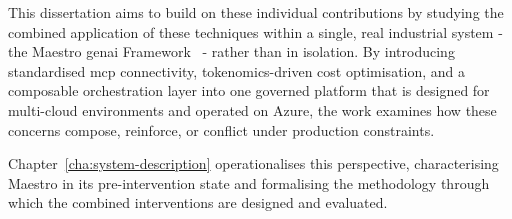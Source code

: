 This dissertation aims to build on these individual contributions by studying the combined application of these techniques within a single, real industrial system - the Maestro \gls{genai} Framework~\cite{closer2025maestro} - rather than in isolation. By introducing standardised \gls{mcp} connectivity, tokenomics-driven cost optimisation, and a composable orchestration layer into one governed platform that is designed for multi-cloud environments and operated on Azure, the work examines how these concerns compose, reinforce, or conflict under production constraints.

Chapter~\ref{cha:system-description} operationalises this perspective, characterising Maestro in its pre-intervention state and formalising the methodology through which the combined interventions are designed and evaluated.
